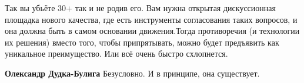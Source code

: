 \begin{itemize}
\begin{itemize}
\end{itemize}


Так вы убьёте 30+ так и не родив его. Вам нужна открытая дискуссионная площадка
нового качества, где есть инструменты согласования таких вопросов, и она должна
быть в самом основании движения.Тогда противоречия (и технологии их решения)
вместо того, чтобы припрятывать, можно будет предъявить как уникальное
преимущество. Или всё очень быстро схлопнется.

\begin{itemize}

\textbf{Олександр Дудка-Булига} Безусловно. И в принципе, она существует.
\end{itemize}

\end{itemize}

